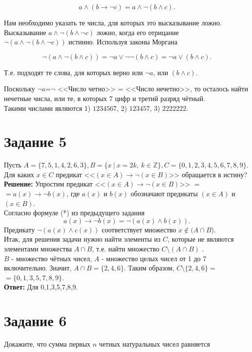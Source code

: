 \documentclass[a4paper,12pt]{article}
\begin{document}
$$a\wedge (b \rightarrow \neg c)=a\wedge \neg( b \wedge c).$$

Нам необходимо указать те числа, для которых это высказывание ложно. Высказывание
$a\wedge \neg( b \wedge \neg c)$ ложно, когда его отрицание \\ $\neg (a\wedge \neg( b \wedge \neg c))$ истинно. Используя законы Моргана

$$\neg (a\wedge \neg( b \wedge c))=\neg a \vee \neg\neg( b \wedge c)=\neg a \vee ( b \wedge c).$$

Т.е. подходят те слова, для которых верно или $\neg a$, или $( b \wedge c)$.

Поскольку $\neg a$=$\neg$ <<Число четно>> = <<Число нечетно>>, то осталось найти нечетные числа, или те, в которых $7$ цифр и третий разряд чётный. \\

Такими числами являются  1)  $1234567$, 2) $123457$, 3) $2222222$.\\

\section*{Задание 5}

Пусть $A=\{7,5,1,4,2,6,3\}, B= \{ x\ |\ x=2k,\ k\in \mathbb{Z} \}, C=\{0,1,2,3,4,5,6,7,8,9\}$. Для каких $x\in C$ предикат <<$(x \in A)\rightarrow \neg(x \in B)$>> обращается в истину? \\

{\bf Решение:}
Упростим предикат <<$(x \in A)\rightarrow \neg(x \in B)$>> $=$\\ $=a(x)\rightarrow \neg b(x)$, где $a(x)$ и $b(x)$ обозначают предикаты $(x \in A)$ и $(x \in B)$. \\

Согласно формуле (*) из предыдущего задания 
$$a(x)\rightarrow \neg b(x)=\neg (a(x) \wedge b(x)).$$
Предикату $\neg (a(x) \wedge c(x))$ соответствует множество $x \notin (A \cap B$). \\
Итак, для решения задачи нужно найти элементы из $C$, которые не являются элементами множества $A \cap B$, т.е. найти множество $C \setminus (A \cap B)$ .\\
$B$ - множество чётных чисел, $A$ - множество целых чисел от 1 до 7 включительно. Значит,  $A \cap B = \{2,4,6\}$. 
Таким образом, $C \setminus \{2,4,6\} =$ \\ $ =\{0,1,3,5,7,8,9\}$. \\

{\bf Ответ:} Для 0,1,3,5,7,8,9.
\section*{Задание 6}
Докажите, что сумма первых $n$ четных натуральных чисел равняется
\end{document}
